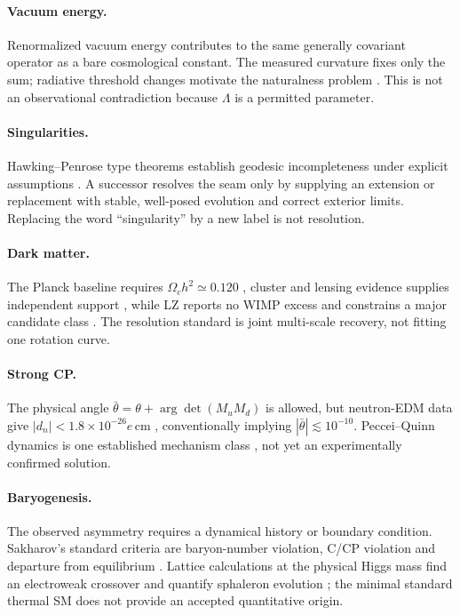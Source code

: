\documentclass[11pt,a4paper]{article}
\begin{document}
\paragraph{Vacuum energy.} Renormalized vacuum energy contributes to the same generally covariant operator as a bare cosmological constant. The measured curvature fixes only the sum; radiative threshold changes motivate the naturalness problem \cite{WeinbergCC1989}. This is not an observational contradiction because $\Lambda$ is a permitted parameter.

\paragraph{Singularities.} Hawking--Penrose type theorems establish geodesic incompleteness under explicit assumptions \cite{HawkingPenrose1970}. A successor resolves the seam only by supplying an extension or replacement with stable, well-posed evolution and correct exterior limits. Replacing the word ``singularity'' by a new label is not resolution.

\paragraph{Dark matter.} The Planck baseline requires $\Omega_ch^2\simeq0.120$ \cite{Planck2018}, cluster and lensing evidence supplies independent support \cite{Bullet2006}, while LZ reports no WIMP excess and constrains a major candidate class \cite{LZ2024}. The resolution standard is joint multi-scale recovery, not fitting one rotation curve.

\paragraph{Strong CP.} The physical angle $\bar\theta=\theta+\arg\det(M_uM_d)$ is allowed, but neutron-EDM data give $|d_n|<1.8\times10^{-26}e\,\mathrm{cm}$ \cite{nEDM2020}, conventionally implying $|\bar\theta|\lesssim10^{-10}$. Peccei--Quinn dynamics is one established mechanism class \cite{PQ1977}, not yet an experimentally confirmed solution.

\paragraph{Baryogenesis.} The observed asymmetry requires a dynamical history or boundary condition. Sakharov's standard criteria are baryon-number violation, C/CP violation and departure from equilibrium \cite{Sakharov1967}. Lattice calculations at the physical Higgs mass find an electroweak crossover and quantify sphaleron evolution \cite{Sphaleron2012}; the minimal standard thermal SM does not provide an accepted quantitative origin.
\end{document}
